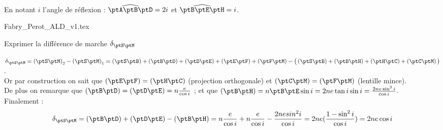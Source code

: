 \smallskip

En notant $i$ l'angle de réflexion : $\widehat{\ptA \ptB \ptD}=2i$ et $\widehat{\ptB \ptE \ptH}=i$.

                                \initialisationPartieDroite %


	\begin{center}
		{Fabry_Perot_ALD_v1.tex}
		\end{center}

		

                               \finalisationDuPartageDePage %

\debutEntrainement



\begin{enonce}
Exprimer la différence de marche $\delta_{\ptS\ptM}$
\end{enonce}


\begin{corrige}
$\delta_{\ptS\ptM}=\left(\ptS\ptM\right)_2 - \left(\ptS\ptM\right)_1 = \left(\ptS\ptB\right)+\left(\ptB\ptD\right)+\left(\ptD\ptE\right)+\left(\ptE\ptF\right) + \left(\ptF\ptM\right) - \big( \left(\ptS\ptB\right) + \left(\ptB\ptH\right) + \left(\ptH\ptC\right) + \left(\ptC\ptM\right) \big)$.\\
Or par construction on sait que $\left(\ptE\ptF\right)=\left(\ptH\ptC\right)$ (projection orthogonale) et $\left(\ptC\ptM\right)=\left(\ptF\ptM\right)$ (lentille mince).\\
De plus on remarque que $\left(\ptB\ptD\right)= \left(\ptD\ptE\right) = n\frac{e}{\cos i}$ ; et que $\left(\ptB\ptH\right) = n\ptB\ptE\sin i = 2n e \tan i \sin i = \frac{2ne \sin^2 i}{\cos i}$.\\
Finalement :
\begin{equation*}
	\delta_{\ptS\ptM}= \left(\ptB\ptD\right)+\left(\ptD\ptE\right) - \left(\ptB\ptH\right) = n\frac{e}{\cos i} + n\frac{e}{\cos i} - \frac{2ne sin^2 i}{\cos i} = 2ne (\frac{1-\sin^2 i}{\cos i} ) = 2ne \cos i
\end{equation*} 
\end{corrige}

